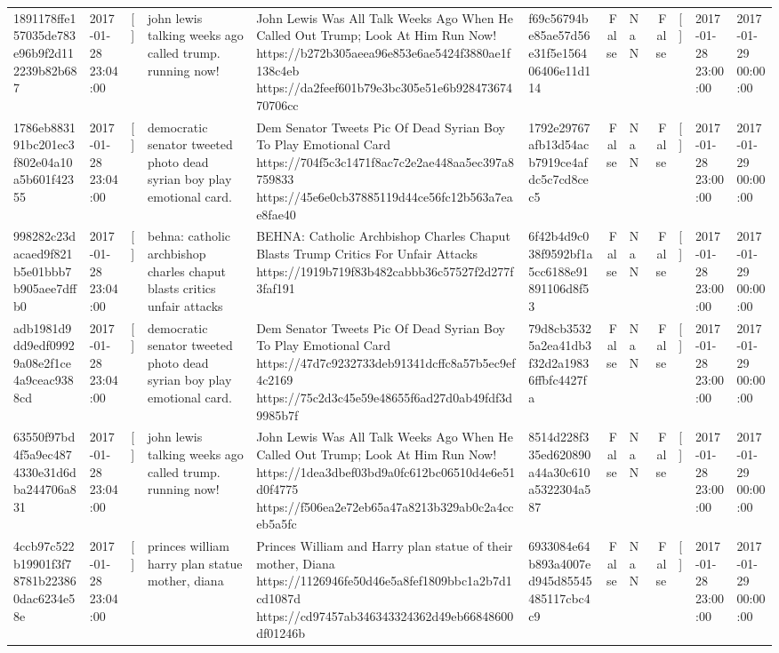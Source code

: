 \begin{tabular}{llllllrlrlll}
1891178ffe157035de783e96b9f2d112239b82b687 & 2017-01-28 23:04:00 & [] & john lewis talking weeks ago called trump. running now! & John Lewis Was All Talk Weeks Ago When He Called Out Trump; Look At Him Run Now! https://b272b305aeea96e853e6ae5424f3880ae1f138c4eb https://da2feef601b79e3bc305e51e6b92847367470706cc & f69c56794be85ae57d56e31f5e156406406e11d114 & False & NaN & False & [] & 2017-01-28 23:00:00 & 2017-01-29 00:00:00 \\
1786eb883191bc201ec3f802e04a10a5b601f42355 & 2017-01-28 23:04:00 & [] & democratic senator tweeted photo dead syrian boy play emotional card. & Dem Senator Tweets Pic Of Dead Syrian Boy To Play Emotional Card https://704f5c3c1471f8ac7c2e2ae448aa5ec397a8759833 https://45e6e0cb37885119d44ce56fc12b563a7eae8fae40 & 1792e29767afb13d54acb7919ce4afdc5c7cd8cec5 & False & NaN & False & [] & 2017-01-28 23:00:00 & 2017-01-29 00:00:00 \\
998282c23dacaed9f821b5e01bbb7b905aee7dffb0 & 2017-01-28 23:04:00 & [] & behna: catholic archbishop charles chaput blasts critics unfair attacks & BEHNA: Catholic Archbishop Charles Chaput Blasts Trump Critics For Unfair Attacks https://1919b719f83b482cabbb36c57527f2d277f3faf191 & 6f42b4d9c038f9592bf1a5cc6188e91891106d8f53 & False & NaN & False & [] & 2017-01-28 23:00:00 & 2017-01-29 00:00:00 \\
adb1981d9dd9edf09929a08e2f1ce4a9ceac9388cd & 2017-01-28 23:04:00 & [] & democratic senator tweeted photo dead syrian boy play emotional card. & Dem Senator Tweets Pic Of Dead Syrian Boy To Play Emotional Card https://47d7c9232733deb91341dcffc8a57b5ec9ef4c2169 https://75c2d3c45e59e48655f6ad27d0ab49fdf3d9985b7f & 79d8cb35325a2ea41db3f32d2a19836ffbfc4427fa & False & NaN & False & [] & 2017-01-28 23:00:00 & 2017-01-29 00:00:00 \\
63550f97bd4f5a9ec4874330e31d6dba244706a831 & 2017-01-28 23:04:00 & [] & john lewis talking weeks ago called trump. running now! & John Lewis Was All Talk Weeks Ago When He Called Out Trump; Look At Him Run Now! https://1dea3dbef03bd9a0fc612bc06510d4e6e51d0f4775 https://f506ea2e72eb65a47a8213b329ab0c2a4cceb5a5fc & 8514d228f335ed620890a44a30c610a5322304a587 & False & NaN & False & [] & 2017-01-28 23:00:00 & 2017-01-29 00:00:00 \\
4ccb97c522b19901f3f78781b223860dac6234e58e & 2017-01-28 23:04:00 & [] & princes william harry plan statue mother, diana & Princes William and Harry plan statue of their mother, Diana https://1126946fe50d46e5a8fef1809bbc1a2b7d1cd1087d https://cd97457ab346343324362d49eb66848600df01246b & 6933084e64b893a4007ed945d85545485117cbc4c9 & False & NaN & False & [] & 2017-01-28 23:00:00 & 2017-01-29 00:00:00 \\

\end{tabular}
